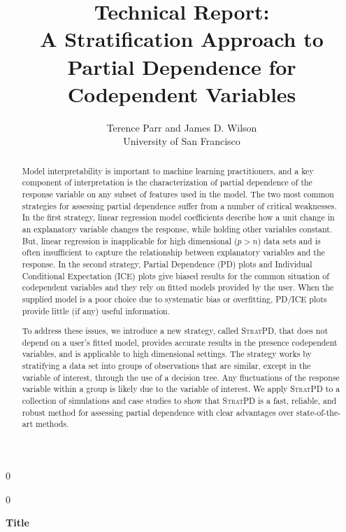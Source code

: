 \documentclass[12pt]{article}
\newcommand{\blind}{0}
\newcommand{\spd}{\fontfamily{cmr}\textsc{\small StratPD}}
\begin{document}
\def\spacingset#1{\renewcommand{\baselinestretch}%
{#1}\small\normalsize} \spacingset{1}



\blind
{
  \title{\bf Technical Report:\\
  A Stratification Approach to Partial Dependence for Codependent Variables}

  \author{Terence Parr and James D. Wilson\\
      University of San Francisco\\
}
  \maketitle
} \fi

\blind
{
  \bigskip
  \bigskip
  \bigskip
  \begin{center}
    {\LARGE\bf Title}
\end{center}
  \medskip
} \fi

\bigskip
\begin{abstract}
Model interpretability is important to machine learning practitioners, and a key component of  interpretation is the characterization of partial dependence of the response variable on any subset of features used in the model. The two most common strategies for assessing partial dependence suffer from a number of critical weaknesses. In the first strategy, linear regression model coefficients describe how a unit change in an explanatory variable changes the response, while holding other variables constant. But, linear regression is inapplicable for high dimensional ($p>n$) data sets and is often insufficient to capture the relationship between explanatory variables and the response.  In the second strategy, Partial Dependence (PD) plots and Individual Conditional Expectation (ICE) plots give biased results for the common situation of codependent variables and they rely on fitted models provided by the user. When the supplied model is a poor choice due to systematic bias or overfitting, PD/ICE plots provide little (if any) useful information.  

To address these issues, we introduce a new strategy, called \spd{}, that does not depend on a user's fitted model, provides accurate results in the presence codependent variables, and is applicable to high dimensional settings. The strategy works by stratifying a data set into groups of observations that are similar, except in the variable of interest, through the use of a decision tree. Any fluctuations of the response variable within a group is likely due to the variable of interest. We apply \spd{} to a collection of simulations and case studies to show that \spd{} is a fast, reliable, and robust method for assessing partial dependence with clear advantages over state-of-the-art methods. 
\end{abstract}
\end{document}
